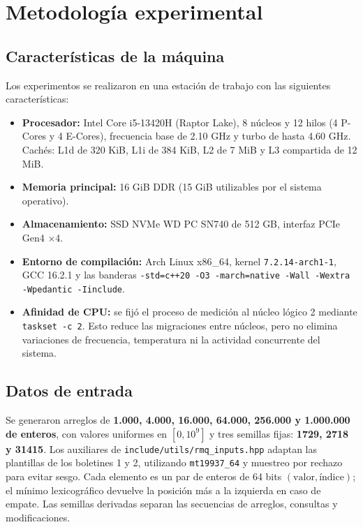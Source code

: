 \section{Metodología experimental}

\subsection{Características de la máquina}

Los experimentos se realizaron en una estación de trabajo con las siguientes
características:
\begin{itemize}
    \item \textbf{Procesador:} Intel Core i5-13420H (Raptor Lake), 8 núcleos y
    12 hilos (4 P-Cores y 4 E-Cores), frecuencia base de 2.10 GHz y turbo de
    hasta 4.60 GHz. Cachés: L1d de 320 KiB, L1i de 384 KiB, L2 de 7 MiB y L3
    compartida de 12 MiB.
    \item \textbf{Memoria principal:} 16 GiB DDR (15 GiB utilizables por el
    sistema operativo).
    \item \textbf{Almacenamiento:} SSD NVMe WD PC SN740 de 512 GB, interfaz
    PCIe Gen4 $\times$4.
    \item \textbf{Entorno de compilación:} Arch Linux x86\_64, kernel
    \texttt{7.2.14-arch1-1}, GCC 16.2.1 y las banderas
    \texttt{-std=c++20 -O3 -march=native -Wall -Wextra -Wpedantic -Iinclude}.
    \item \textbf{Afinidad de CPU:} se fijó el proceso de medición al núcleo
    lógico 2 mediante \texttt{taskset -c 2}. Esto reduce las migraciones entre
    núcleos, pero no elimina variaciones de frecuencia, temperatura ni la
    actividad concurrente del sistema.
\end{itemize}

\subsection{Datos de entrada}

Se generaron arreglos de \textbf{1.000, 4.000, 16.000, 64.000, 256.000 y
1.000.000 de enteros}, con valores uniformes en \([0,10^9]\) y tres semillas
fijas: \textbf{1729, 2718 y 31415}. Los auxiliares de
\texttt{include/utils/rmq\_inputs.hpp} adaptan las plantillas de los boletines
1 y 2, utilizando \texttt{mt19937\_64} y muestreo por rechazo para evitar
sesgo. Cada elemento es un par de enteros de 64 bits
\((\text{valor},\text{índice})\); el mínimo lexicográfico devuelve la
posición más a la izquierda en caso de empate. Las semillas derivadas separan
las secuencias de arreglos, consultas y modificaciones.

